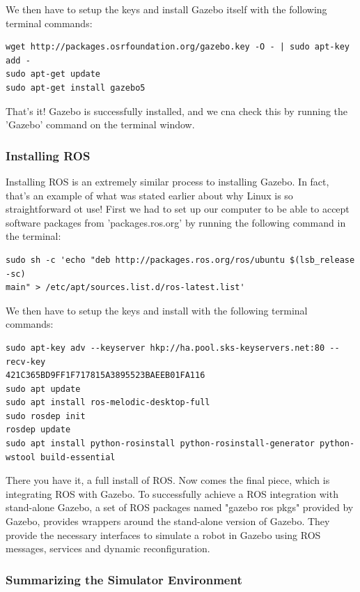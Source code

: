 \documentclass[12pt]{report}
\begin{document}
We then have to setup the keys and install Gazebo itself with the following terminal commands:
\begin{verbatim}
wget http://packages.osrfoundation.org/gazebo.key -O - | sudo apt-key add -
sudo apt-get update
sudo apt-get install gazebo5
\end{verbatim}

That's it! Gazebo is successfully installed, and we cna check this by running the 'Gazebo' command on the terminal window.

\subsubsection*{Installing ROS}

Installing ROS is an extremely similar process to installing Gazebo. In fact, that's an example of what was stated earlier about why Linux is so straightforward ot use! First we had to set up our computer to be able to accept software packages from 'packages.ros.org' by running the following command in the terminal:

\begin{verbatim}
sudo sh -c 'echo "deb http://packages.ros.org/ros/ubuntu $(lsb_release -sc)
main" > /etc/apt/sources.list.d/ros-latest.list'
\end{verbatim}

We then have to setup the keys and install with the following terminal commands:

\begin{verbatim}
sudo apt-key adv --keyserver hkp://ha.pool.sks-keyservers.net:80 --recv-key
421C365BD9FF1F717815A3895523BAEEB01FA116
sudo apt update
sudo apt install ros-melodic-desktop-full
sudo rosdep init
rosdep update
sudo apt install python-rosinstall python-rosinstall-generator python-wstool build-essential
\end{verbatim}

There you have it, a full install of ROS. Now comes the final piece, which is integrating ROS with Gazebo. To successfully achieve a ROS integration with stand-alone Gazebo, a set of ROS packages named "gazebo ros pkgs" provided by Gazebo, provides wrappers around the stand-alone version of Gazebo.\cite{GazeboRosIntegration} They provide the necessary interfaces to simulate a robot in Gazebo using ROS messages, services and dynamic reconfiguration.


\subsubsection*{Summarizing the Simulator Environment}
\end{document}
